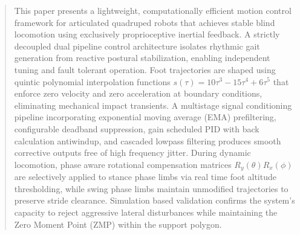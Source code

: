 \begin{abstract}

This paper presents a lightweight, computationally efficient
motion control framework for articulated quadruped robots that
achieves stable blind locomotion using exclusively proprioceptive
inertial feedback. A strictly decoupled dual pipeline control
architecture isolates rhythmic gait generation from reactive
postural stabilization, enabling independent tuning and
fault tolerant operation. Foot trajectories are shaped using
quintic polynomial interpolation functions
$s(\tau)=10\tau^3-15\tau^4+6\tau^5$ that enforce zero velocity
and zero acceleration at boundary conditions, eliminating
mechanical impact transients. A multistage signal conditioning
pipeline incorporating exponential moving average (EMA)
prefiltering, configurable deadband suppression, gain scheduled
PID with back calculation antiwindup, and cascaded lowpass
filtering produces smooth corrective outputs free of
high frequency jitter. During dynamic locomotion, phase aware
rotational compensation matrices $R_y(\theta)R_x(\phi)$ are
selectively applied to stance phase limbs via real time foot
altitude thresholding, while swing phase limbs maintain
unmodified trajectories to preserve stride clearance.
Simulation based validation confirms the system's capacity to
reject aggressive lateral disturbances while maintaining the
Zero Moment Point (ZMP) within the support polygon.

\end{abstract}
